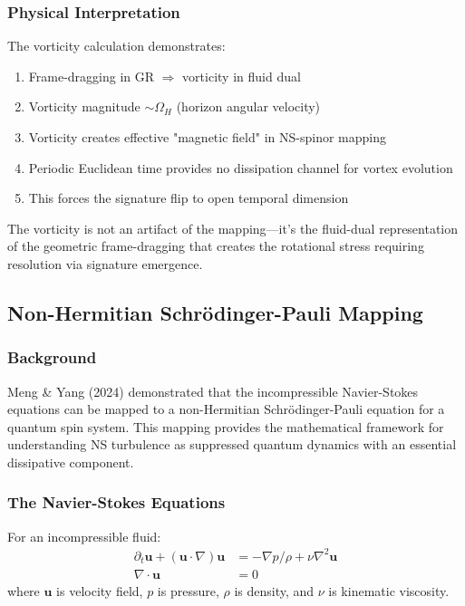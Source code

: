 \documentclass[11pt]{article}
\begin{document}
\subsubsection{Physical Interpretation}

The vorticity calculation demonstrates:
\begin{enumerate}
\item Frame-dragging in GR $\Rightarrow$ vorticity in fluid dual
\item Vorticity magnitude $\sim \Omega_H$ (horizon angular velocity)
\item Vorticity creates effective "magnetic field" in NS-spinor mapping
\item Periodic Euclidean time provides no dissipation channel for vortex evolution
\item This forces the signature flip to open temporal dimension
\end{enumerate}

The vorticity is not an artifact of the mapping—it's the fluid-dual representation of the geometric frame-dragging that creates the rotational stress requiring resolution via signature emergence.

\subsection{Non-Hermitian Schr\"odinger-Pauli Mapping}
\label{subsec:ns-spinor-mapping}

\subsubsection{Background}

Meng \& Yang (2024) demonstrated that the incompressible Navier-Stokes equations can be mapped to a non-Hermitian Schr\"odinger-Pauli equation for a quantum spin system. This mapping provides the mathematical framework for understanding NS turbulence as suppressed quantum dynamics with an essential dissipative component.

\subsubsection{The Navier-Stokes Equations}

For an incompressible fluid:
\begin{align}
\partial_t \mathbf{u} + (\mathbf{u} \cdot \nabla)\mathbf{u} &= -\nabla p/\rho + \nu \nabla^2 \mathbf{u} \\
\nabla \cdot \mathbf{u} &= 0
\end{align}
where $\mathbf{u}$ is velocity field, $p$ is pressure, $\rho$ is density, and $\nu$ is kinematic viscosity.
\end{document}
